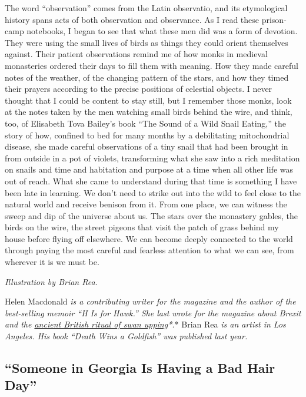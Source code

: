 The word ``observation'' comes from the Latin observatio, and its
etymological history spans acts of both observation and observance. As I
read these prison-camp notebooks, I began to see that what these men did
was a form of devotion. They were using the small lives of birds as
things they could orient themselves against. Their patient observations
remind me of how monks in medieval monasteries ordered their days to
fill them with meaning. How they made careful notes of the weather, of
the changing pattern of the stars, and how they timed their prayers
according to the precise positions of celestial objects. I never thought
that I could be content to stay still, but I remember those monks, look
at the notes taken by the men watching small birds behind the wire, and
think, too, of Elisabeth Tova Bailey's book ``The Sound of a Wild Snail
Eating,'' the story of how, confined to bed for many months by a
debilitating mitochondrial disease, she made careful observations of a
tiny snail that had been brought in from outside in a pot of violets,
transforming what she saw into a rich meditation on snails and time and
habitation and purpose at a time when all other life was out of reach.
What she came to understand during that time is something I have been
late in learning. We don't need to strike out into the wild to feel
close to the natural world and receive benison from it. From one place,
we can witness the sweep and dip of the universe about us. The stars
over the monastery gables, the birds on the wire, the street pigeons
that visit the patch of grass behind my house before flying off
elsewhere. We can become deeply connected to the world through paying
the most careful and fearless attention to what we can see, from
wherever it is we must be.

\emph{Illustration by Brian Rea.}

Helen Macdonald \emph{\emph{is a contributing writer for the magazine
and the author of the best-selling memoir ``H Is for Hawk.'' She last
wrote for the magazine about Brexit and the}
\href{https://www.nytimes3xbfgragh.onion/2017/01/05/magazine/in-search-of-post-brexit-england-and-swans.html}{ancient
British ritual of swan upping}*.}* Brian Rea \emph{is an artist in Los
Angeles. His book ``Death Wins a Goldfish'' was published last year.}

\hypertarget{someone-in-georgia-is-having-a-bad-hair-day}{%
\subsection{``Someone in Georgia Is Having a Bad Hair
Day''}\label{someone-in-georgia-is-having-a-bad-hair-day}}

